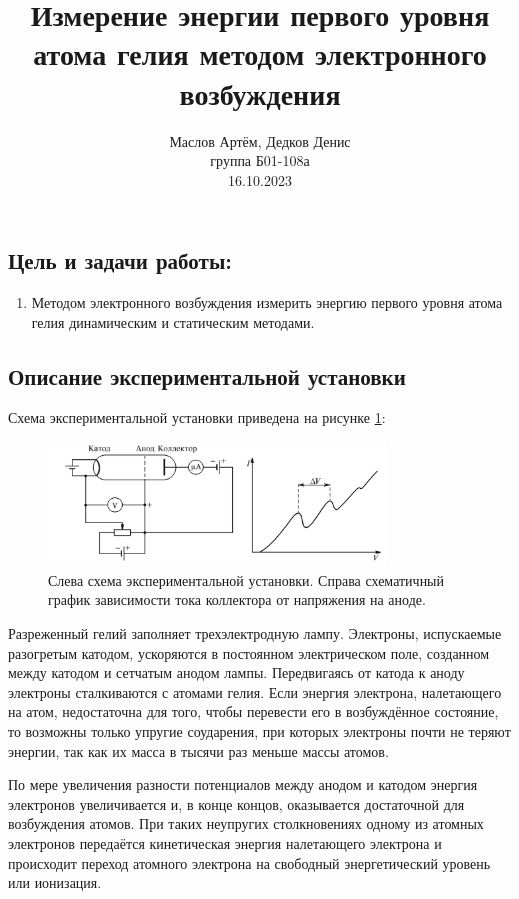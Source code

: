 \documentclass[10pt,a4paper]{article}
\author{\normalsize Маслов Артём, Дедков Денис \\
	\normalsize группа Б01-108а \\
	\normalsize 16.10.2023}
\date{}
\title{
	\Large Измерение энергии первого уровня атома гелия методом электронного возбуждения \\ 
}
\begin{document}
\maketitle
	
	\subsection*{Цель и задачи работы:}
	\begin{enumerate}
		\item Методом электронного возбуждения измерить энергию первого уровня атома гелия динамическим и статическим методами.
	\end{enumerate}
	
	\subsection*{Описание экспериментальной установки}
	
	Схема экспериментальной установки приведена на рисунке \ref{img:exp_scheme}:
	\begin{figure}[H]
		\centering
		\includegraphics[width=0.8\textwidth]{res/exp_scheme.png}
		\caption{Слева схема экспериментальной установки. Справа схематичный график зависимости тока коллектора от напряжения на аноде.}
		\label{img:exp_scheme}
	\end{figure}

	Разреженный гелий заполняет трехэлектродную лампу. Электроны, испускаемые разогретым катодом, ускоряются в постоянном электрическом поле, созданном между катодом и сетчатым анодом лампы. Передвигаясь от катода к аноду электроны сталкиваются с атомами гелия. Если энергия электрона, налетающего на атом, недостаточна для того, чтобы перевести его в возбуждённое состояние, то возможны только упругие соударения, при которых электроны почти не теряют энергии, так как их масса в тысячи раз меньше массы атомов.
	
	По мере увеличения разности потенциалов между анодом и катодом энергия электронов увеличивается и, в конце концов, оказывается достаточной для возбуждения атомов. При таких неупругих столкновениях одному из атомных электронов передаётся кинетическая энергия налетающего электрона и происходит переход атомного электрона на свободный энергетический уровень или ионизация.
	
\end{document}
